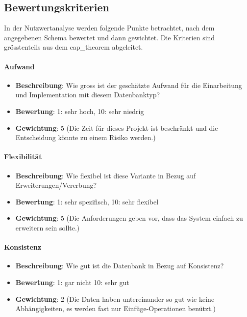 \subsection{Bewertungskriterien}\label{architektur_bewertungspunkte}

In der Nutzwertanalyse werden folgende Punkte betrachtet, nach dem angegebenen Schema bewertet und dann gewichtet. 
Die Kriterien sind grösstenteils aus dem \gls{cap_theorem} abgeleitet.

\paragraph{Aufwand}
\begin{itemize}
	\item \textbf{Beschreibung}: Wie gross ist der geschätzte Aufwand für die Einarbeitung und Implementation mit diesem Datenbanktyp?
	\item \textbf{Bewertung}: 1: sehr hoch, 10: sehr niedrig
	\item \textbf{Gewichtung}: 5 (Die Zeit für dieses Projekt ist beschränkt und die Entscheidung könnte zu einem Risiko werden.)
\end{itemize}

\paragraph{Flexibilität}
\begin{itemize}
	\item \textbf{Beschreibung}: Wie flexibel ist diese Variante in Bezug auf Erweiterungen/Vererbung?
	\item \textbf{Bewertung}: 1: sehr spezifisch, 10: sehr flexibel
	\item \textbf{Gewichtung}: 5 (Die Anforderungen geben vor, dass das System einfach zu erweitern sein sollte.)
\end{itemize}

\paragraph{Konsistenz}
\begin{itemize}
	\item \textbf{Beschreibung}: Wie gut ist die Datenbank in Bezug auf Konsistenz?
	\item \textbf{Bewertung}: 1: gar nicht 10: sehr gut
	\item \textbf{Gewichtung}: 2 (Die Daten haben untereinander so gut wie keine Abhängigkeiten, es werden fast nur Einfüge-Operationen benützt.)
\end{itemize}

